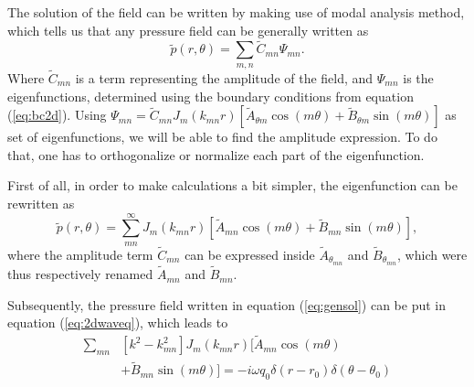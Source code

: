 \documentclass[%
 reprint,
 amsmath,amssymb,
 aip,
]{revtex4-1}
\begin{document}
The solution of the field can be written by making use of modal analysis method, which tells us that any pressure field can be generally written as 
\begin{equation}
    \tilde{p}(r, \theta) = \sum_{m,n} \tilde{C}_{mn} \Psi_{mn}.
\end{equation}
Where $\tilde{C}_{mn}$ is a term representing the amplitude of the field, and $\Psi_{mn}$ is the eigenfunctions, determined using the boundary conditions from equation (\ref{eq:bc2d}). Using $\Psi_{mn} = \tilde{C}_{mn} J_m (k_{mn}r)\left[ \tilde{A}_{\theta m} \cos(m \theta) + \tilde{B}_{\theta m} \sin(m \theta) \right]$ as set of eigenfunctions, we will be able to find the amplitude expression. To do that, one has to orthogonalize or normalize each part of the eigenfunction.

First of all, in order to make calculations a bit simpler, the eigenfunction can be rewritten as
\begin{equation}
        \tilde{p}(r, \theta) = \sum_{mn}^{\infty} J_m(k_{mn}r) \left[ \tilde{A}_{mn} \cos(m \theta) + \tilde{B}_{mn} \sin(m \theta) \right], \label{eq:gensol}
\end{equation}
where the amplitude term $\tilde{C}_{mn}$ can be expressed inside $\tilde{A}_{\theta_{mn}}$ and $\tilde{B}_{\theta_{mn}}$, which were thus respectively renamed $\tilde{A}_{mn}$ and $\tilde{B}_{mn}$. 

Subsequently, the pressure field written in equation (\ref{eq:gensol}) can be put in equation (\ref{eq:2dwaveq}), which leads to
\begin{equation}
    \begin{split}
        \sum_{mn} &\left[ k^2 - k_{mn}^2 \right] J_m(k_{mn}r) \Big[ \tilde{A}_{mn} \cos(m\theta) \\&+ \tilde{B}_{mn} \sin(m\theta) \Big]= - i \omega q_0 \delta(r - r_0) \delta(\theta - \theta_0)
    \end{split} \label{eq:rawsol}
\end{equation}
\end{document}
